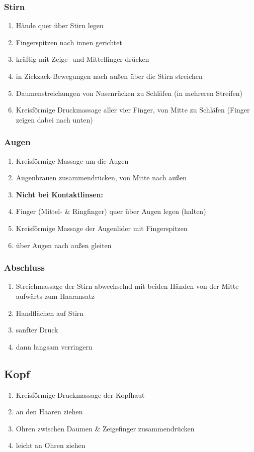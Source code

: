 \subsubsection{Stirn}
\begin{enumerate}
\item Hände quer über Stirn legen
\item Fingerspitzen nach innen gerichtet
\item kräftig mit Zeige- und Mittelfinger drücken
\item in Zickzack-Bewegungen nach außen über die Stirn streichen
\item Daumenstreichungen von Nasenrücken zu Schläfen (in mehreren Streifen)
\item Kreisförmige Druckmassage aller vier Finger, von Mitte zu Schläfen (Finger zeigen dabei nach unten)
\end{enumerate}

\subsubsection{Augen}
\begin{enumerate}
\item Kreisförmige Massage um die Augen
\item Augenbrauen zusammendrücken, von Mitte nach außen
\item \textbf{Nicht bei Kontaktlinsen:}
\item Finger (Mittel- \& Ringfinger) quer über Augen legen (halten)
\item Kreisförmige Massage der Augenlider mit Fingerspitzen
\item über Augen nach außen gleiten
\end{enumerate}

\subsubsection{Abschluss}
\begin{enumerate}
\item Streichmassage der Stirn abwechselnd mit beiden Händen von der Mitte aufwärts zum Haaransatz
\item Handflächen auf Stirn
\item sanfter Druck
\item dann langsam verringern
\end{enumerate}

\subsection{Kopf}
\begin{enumerate}
\item Kreisförmige Druckmassage der Kopfhaut
\item an den Haaren ziehen
\item Ohren zwischen Daumen \& Zeigefinger zusammendrücken
\item leicht an Ohren ziehen
\end{enumerate}

